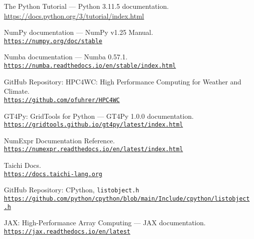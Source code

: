 \documentclass[12pt]{article}
\begin{document}
\newpage
\begin{thebibliography}{9}
     The Python Tutorial — Python 3.11.5 documentation.\\\href{https://docs.python.org/3/tutorial/index.html}{https://docs.python.org/3/tutorial/index.html}

     NumPy documentation — NumPy v1.25 Manual.\\\href{https://numpy.org/doc/stable}{\texttt{https://numpy.org/doc/stable}}

     Numba documentation — Numba 0.57.1.\\\href{https://numba.readthedocs.io/en/stable/index.html}{\texttt{https://numba.readthedocs.io/en/stable/index.html}}
    
     GitHub Repository: HPC4WC: High Performance Computing for Weather and Climate.\\\href{https://github.com/ofuhrer/HPC4WC}{\texttt{https://github.com/ofuhrer/HPC4WC}}

     GT4Py: GridTools for Python — GT4Py 1.0.0 documentation.\\ \href{https://gridtools.github.io/gt4py/latest/index.html}{\texttt{https://gridtools.github.io/gt4py/latest/index.html}}
    
     NumExpr Documentation Reference.\\\href{https://numexpr.readthedocs.io/en/latest/index.html}{\texttt{https://numexpr.readthedocs.io/en/latest/index.html}}

     Taichi Docs.\\\href{https://docs.taichi-lang.org}{\texttt{https://docs.taichi-lang.org}}

     GitHub Repository: CPython, \texttt{listobject.h}\\\href{https://github.com/python/cpython/blob/main/Include/cpython/listobject.h}{\texttt{https://github.com/python/cpython/blob/main/Include/cpython/listobject.h}}

     JAX: High-Performance Array Computing — JAX documentation.\\\href{https://jax.readthedocs.io/en/latest}{\texttt{https://jax.readthedocs.io/en/latest}}
\end{thebibliography}
\end{document}
